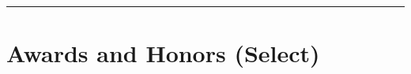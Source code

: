 \documentclass[letterpaper]{article}
\renewenvironment{itemize}{
  \begin{list}{}{
    \setlength{\leftmargin}{1.5em}
  }
}{
  \end{list}
}
\begin{document}
\begin{itemize}

\end{itemize}

\vspace{0.1in}
\hrule

\section*{Awards and Honors (Select)}
\end{document}
